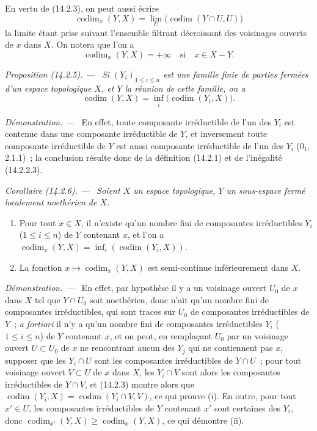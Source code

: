 \documentclass[10pt,oneside]{book}
\makeatletter
\newcommand{\setmanualcurrentlabel}[1]{\def\@currentlabel{#1}}
\newcommand{\oldpage}[2][]{%
  \setcounter{footnote}{0}%
  \marginpar{\scriptsize\textbf{#1}~|~#2}\ignorespaces}
\newenvironment{proposition}[1][]{%
  \setmanualcurrentlabel{#1}\par\medskip\noindent\itshape Proposition (#1). ---\ }{\par}
\newenvironment{corollary}[1][]{%
  \setmanualcurrentlabel{#1}\par\medskip\noindent\itshape Corollaire (#1). ---\ }{\par}
\newenvironment{proof}{%
  \par\medskip\noindent\textit{Démonstration. ---\ }}{\par}
\makeatother
\begin{document}
En vertu de (14.2.3), on peut aussi écrire
\[
  \operatorname{codim}_x(Y,X)=
  \lim_U\bigl(\operatorname{codim}(Y\cap U,U)\bigr)
  \tag{14.2.4.1}\label{0.14.2.4.1-fr}
\]
la limite étant prise suivant l'ensemble filtrant décroissant des voisinages
ouverts de $x$ dans $X$. On notera que l'on a
\[
  \operatorname{codim}_x(Y,X)=+\infty\quad\text{si}\quad x\in X-Y.
\]

\oldpage[0\textsubscript{IV-1}]{10}
\begin{proposition}[14.2.5]
\label{0.14.2.5-fr}
Si $(Y_i)_{1\leq i\leq n}$ est une famille finie de parties fermées d'un
espace topologique $X$, et $Y$ la réunion de cette famille, on a
\[
  \operatorname{codim}(Y,X)=
  \inf_i\bigl(\operatorname{codim}(Y_i,X)\bigr).
  \tag{14.2.5.1}\label{0.14.2.5.1-fr}
\]
\end{proposition}

\begin{proof}
En effet, toute composante irréductible de l'un des $Y_i$ est contenue dans
une composante irréductible de $Y$, et inversement toute composante
irréductible de $Y$ est aussi composante irréductible de l'un des $Y_i$
($0_{\mathrm I}$, 2.1.1)~; la conclusion résulte donc de la définition
(14.2.1) et de l'inégalité (14.2.2.3).
\end{proof}

\begin{corollary}[14.2.6]
\label{0.14.2.6-fr}
Soient $X$ un espace topologique, $Y$ un sous-espace fermé localement
noethérien de $X$.
\begin{enumerate}
  \item[\rm(i)] Pour tout $x\in X$, il n'existe qu'un nombre fini de
  composantes irréductibles $Y_i$ ($1\leq i\leq n$) de $Y$ contenant $x$,
  et l'on a
  $\operatorname{codim}_x(Y,X)=
  \inf_i(\operatorname{codim}(Y_i,X))$.
  \item[\rm(ii)] La fonction
  $x\mapsto\operatorname{codim}_x(Y,X)$ est semi-continue inférieurement
  dans $X$.
\end{enumerate}
\end{corollary}

\begin{proof}
En effet, par hypothèse il y a un voisinage ouvert $U_0$ de $x$ dans $X$ tel
que $Y\cap U_0$ soit noethérien, donc n'ait qu'un nombre fini de composantes
irréductibles, qui sont traces sur $U_0$ de composantes irréductibles de $Y$~;
\emph{a fortiori} il n'y a qu'un nombre fini de composantes irréductibles
$Y_i$ ($1\leq i\leq n$) de $Y$ contenant $x$, et on peut, en remplaçant $U_0$
par un voisinage ouvert $U\subset U_0$ de $x$ ne rencontrant aucun des $Y_j$
qui ne contiennent pas $x$, supposer que les $Y_i\cap U$ sont les composantes
irréductibles de $Y\cap U$~; pour tout voisinage ouvert $V\subset U$ de $x$
dans $X$, les $Y_i\cap V$ sont alors les composantes irréductibles de
$Y\cap V$, et (14.2.3) montre alors que
$\operatorname{codim}(Y_i,X)=\operatorname{codim}(Y_i\cap V,V)$, ce qui
prouve (i). En outre, pour tout $x'\in U$, les composantes irréductibles de
$Y$ contenant $x'$ sont certaines des $Y_i$, donc
$\operatorname{codim}_{x'}(Y,X)\geq\operatorname{codim}_x(Y,X)$, ce qui
démontre (ii).
\end{proof}
\end{document}
